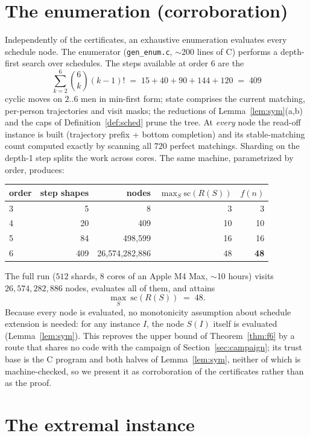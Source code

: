 \documentclass[11pt]{article}
\begin{document}
\section{The enumeration (corroboration)}\label{sec:enum}

Independently of the certificates, an exhaustive enumeration evaluates every schedule node.
The enumerator (\texttt{gen\_enum.c}, $\sim$200 lines of C) performs a depth-first search over
schedules. The steps available at order $6$ are the
\[
\sum_{k=2}^{6}\binom{6}{k}(k-1)!\;=\;15+40+90+144+120\;=\;409
\]
cyclic moves on $2..6$ men in min-first form; state comprises the current matching,
per-person trajectories and visit masks; the reductions of Lemma~\ref{lem:sym}(a,b) and
the caps of Definition~\ref{def:sched} prune the tree. At \emph{every} node the read-off
instance is built (trajectory prefix + bottom completion) and its stable-matching count
computed exactly by scanning all $720$ perfect matchings. Sharding on the depth-1 step
splits the work across cores. The same machine, parametrized by order, produces:
\begin{center}
\begin{tabular}{lrrrr}
\toprule
order & step shapes & nodes & $\max_S \mathrm{sc}(R(S))$ & $f(n)$\\
\midrule
3 & 5   & 8                    & 3  & 3\\
4 & 20  & 409                  & 10 & 10\\
5 & 84  & 498{,}599            & 16 & 16\\
6 & 409 & 26{,}574{,}282{,}886 & 48 & \textbf{48}\\
\bottomrule
\end{tabular}
\end{center}

The full run ($512$ shards, $8$ cores of an Apple M4 Max, $\sim$10 hours) visits
$26{,}574{,}282{,}886$ nodes, evaluates all of them, and attains
\[
\max_S\ \mathrm{sc}(R(S)) \;=\; 48 .
\]
Because every node is evaluated, no monotonicity assumption about schedule extension is needed:
for any instance $I$, the node $S(I)$ itself is evaluated (Lemma~\ref{lem:sym}). This reproves the
upper bound of Theorem~\ref{thm:f6} by a route that shares no code with the campaign of
Section~\ref{sec:campaign}; its trust base is the C program and both halves of
Lemma~\ref{lem:sym}, neither of which is machine-checked, so we present it as corroboration of the
certificates rather than as the proof.


\section{The extremal instance}\label{sec:extremal}
\end{document}
